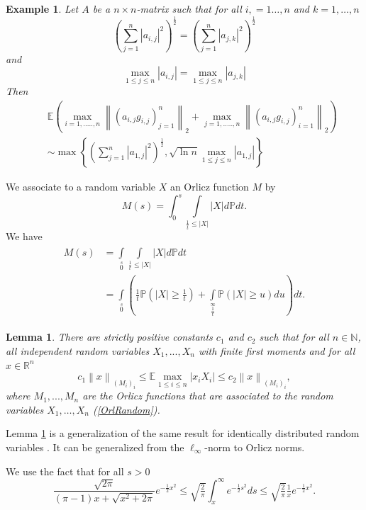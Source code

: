 \documentclass[12pt,a4paper]{article}
\newtheorem{lem}[satz]{Lemma}
\newtheorem{bsp}[satz]{Example}
\newcommand{\R}{\ensuremath{{\mathbb R}}}
\newcommand{\Pv}{\mathbb{P}}
\newcommand{\Ex}{\mathbb{E}}
\newcommand{\norm}[1]{\left \lVert#1 \right\rVert}
\begin{document}
{\footnotesize
\vskip 1mm
\begin{bsp}
Let $A$ be a $n\times n$-matrix such that for all $i,=1\dots,n$ and $k=1,\dots,n$
$$
\left(\sum_{j=1}^{n}|a_{i,j}|^{2}\right)^{\frac{1}{2}}
=\left(\sum_{j=1}^{n}|a_{j,k}|^{2}\right)^{\frac{1}{2}}
$$
and
$$
\max_{1\leq j\leq n}|a_{i,j}|
=\max_{1\leq j\leq n}|a_{j,k}|
$$
Then
\begin{eqnarray*}
&&\Ex\left(\max\limits_{i=1,..\dots,n}\norm{(a_{i,j}g_{i,j})_{j=1}^n}_2+
\max\limits_{j=1,..\dots,n}\norm{(a_{i,j}g_{i,j})_{i=1}^n}_2\right)  \\
&&\sim\max\left\{\left(\sum_{j=1}^{n}|a_{1,j}|^{2}\right)^{\frac{1}{2}},
\sqrt{\ln n}\max_{1\leq j\leq n}|a_{1,j}|\right\}
\end{eqnarray*}
\end{bsp}
}
\noindent
We associate to a random variable $X$ an Orlicz function $M$ by
\begin{equation}\label{OrlRandom}
M(s)=\int_0^s\int\limits_{\frac{1}{t}\leq |X|}|X|d\Pv dt.
\end{equation}
We have
\begin{eqnarray}\label{OrlRandom1}
		\left.\begin{split}
		M(s)
		&=\int\limits_0\limits^s\int\limits_{\frac{1}{t}\leq |X|}|X|d\Pv dt  \\
		&=\int\limits_0\limits^s\left(\frac{1}{t}\Pv\left(|X|\geq\frac{1}{t}\right)+\int\limits_{\frac{1}{t}}\limits^{\infty}\Pv\left(|X|\geq u\right)du\right)dt.
		\end{split}\right.
		\end{eqnarray}
\vskip 3mm

\begin{lem}\label{thm:wichtig_orlicz} There are strictly positive constants
$c_{1}$ and $c_{2}$ such that for all $n\in\mathbb N$, all
independent random variables $X_1,...,X_n$ with finite first moments
and 
for all $x\in\R^n$ 
$$
c_{1}\norm{x}_{(M_i)_i}
\leq \Ex\max\limits_{1\leq i\leq n}|x_iX_i|
\leq c_2\norm{x}_{(M_i)_i},
$$
where $M_1,...,M_n$ are the
 Orlicz functions that are associated to the random variables 
 $X_{1},\dots,X_{n}$ (\ref{OrlRandom}).
\end{lem}
\vskip 3mm


Lemma \ref{thm:wichtig_orlicz} is a generalization of the same result for
identically distributed random variables \cite{GLSW1}. It can be generalized
from the $\ell_{\infty}$-norm to Orlicz norms.
\par
We use the fact \cite{RuW} that for all $s>0$ 
\begin{equation}\label{eqn:integral}
\frac{\sqrt{2\pi}}{(\pi-1)x+\sqrt{x^{2}+2\pi}}e^{-\tfrac{1}{2}x^{2}}
\leq
\sqrt{\tfrac{2}{\pi}}\int_{x}^{\infty}e^{-\tfrac{1}{2}s^{2}}ds
\leq
\sqrt{\tfrac{2}{\pi}}\tfrac{1}{x}e^{-\frac{1}{2}x^{2}} . 
\end{equation} 
\vskip 3mm
\end{document}
